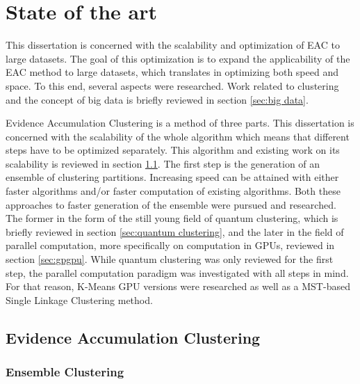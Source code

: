 
\chapter{State of the art}
\label{chapter:stateofart}


This dissertation is concerned with the scalability and optimization of EAC to large datasets.
The goal of this optimization is to expand the applicability of the EAC method to large datasets, which translates in optimizing both speed and space.
To this end, several aspects were researched.
Work related to clustering and the concept of big data is briefly reviewed in section \ref{sec:big data}.


Evidence Accumulation Clustering is a method of three parts.
This dissertation is concerned with the scalability of the whole algorithm which means that different steps have to be optimized separately.
This algorithm and existing work on its scalability is reviewed in section \ref{sec:eac}.
The first step is the generation of an ensemble of clustering partitions.
Increasing speed can be attained with either faster algorithms and/or faster computation of existing algorithms.
Both these approaches to faster generation of the ensemble were pursued and researched.
The former in the form of the still young field of quantum clustering, which is briefly reviewed in section \ref{sec:quantum clustering}, and the later in the field of parallel computation, more specifically on computation in GPUs, reviewed in section \ref{sec:gpgpu}.
While quantum clustering was only reviewed for the first step, the parallel computation paradigm was investigated with all steps in mind.
For that reason, K-Means GPU versions were researched as well as a MST-based Single Linkage Clustering method.


\section{Evidence Accumulation Clustering}
\label{sec:eac}

\subsection{Ensemble Clustering}


